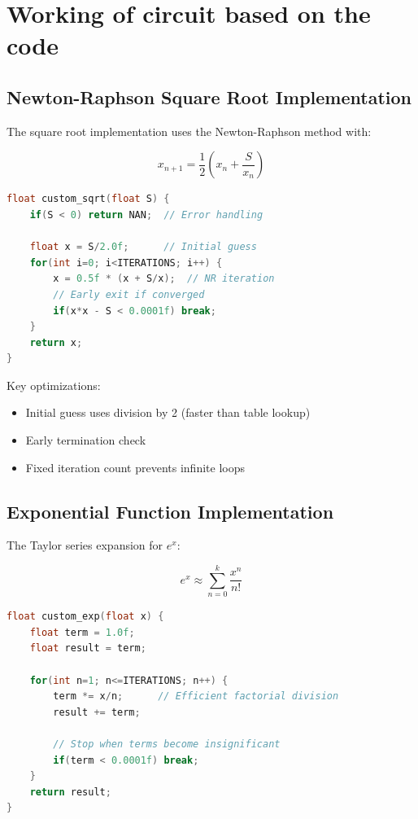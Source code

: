 \documentclass{article}
\begin{document}
\section{Working of circuit based on the code}

\subsection{Newton-Raphson Square Root Implementation}

The square root implementation uses the Newton-Raphson method with:

\begin{equation}
x_{n+1} = \frac{1}{2}\left(x_n + \frac{S}{x_n}\right)
\end{equation}

\begin{lstlisting}[language=C]
float custom_sqrt(float S) {
    if(S < 0) return NAN;  // Error handling
    
    float x = S/2.0f;      // Initial guess
    for(int i=0; i<ITERATIONS; i++) {
        x = 0.5f * (x + S/x);  // NR iteration
        // Early exit if converged
        if(x*x - S < 0.0001f) break;
    }
    return x;
}
\end{lstlisting}

Key optimizations:
\begin{itemize}
\item Initial guess uses division by 2 (faster than table lookup)
\item Early termination check
\item Fixed iteration count prevents infinite loops
\end{itemize}

\subsection{Exponential Function Implementation}

The Taylor series expansion for $e^x$:

\begin{equation}
e^x \approx \sum_{n=0}^{k}\frac{x^n}{n!}
\end{equation}

\begin{lstlisting}[language=C]
float custom_exp(float x) {
    float term = 1.0f;
    float result = term;
    
    for(int n=1; n<=ITERATIONS; n++) {
        term *= x/n;      // Efficient factorial division
        result += term;
        
        // Stop when terms become insignificant
        if(term < 0.0001f) break;
    }
    return result;
}
\end{lstlisting}
\end{document}
